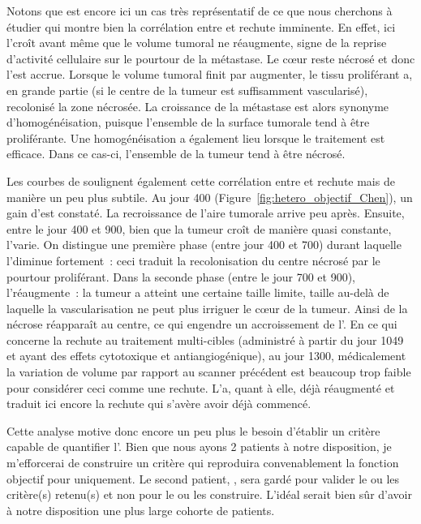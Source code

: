 \documentclass[main.tex]{subfiles}
\begin{document}
 
Notons que \Nber est encore ici un cas très représentatif de ce que nous  cherchons à étudier \ie qui montre bien la corrélation entre \hetero et rechute imminente. En effet, ici l'\hetero croît avant même que le volume tumoral ne réaugmente, signe de la reprise d'activité cellulaire sur le pourtour de la métastase. Le c\oe{}ur reste nécrosé et donc l'\hetero est accrue. Lorsque le volume tumoral  finit par augmenter, le tissu proliférant a, en grande partie (si le centre de la tumeur est suffisamment vascularisé), recolonisé la zone nécrosée. La croissance de la métastase est alors synonyme d'homogénéisation, puisque l'ensemble de la surface tumorale tend à être proliférante. Une homogénéisation a également lieu lorsque le traitement est efficace. Dans ce cas-ci, l'ensemble de la tumeur tend à être nécrosé. 


Les courbes de \Chen soulignent également cette corrélation entre \hetero et rechute mais de manière un peu plus subtile. Au jour 400 (\cf Figure~\ref{fig:hetero_objectif_Chen}), un gain d'\hetero est constaté. La recroissance de l'aire tumorale arrive peu après. Ensuite, entre le jour 400 et 900, bien que la tumeur croît de manière quasi constante, l'\hetero varie. On distingue une première phase (entre jour 400 et 700) durant laquelle l'\hetero diminue fortement~: ceci traduit la recolonisation du centre nécrosé par le pourtour proliférant. Dans la seconde phase (entre le jour 700 et 900), l'\hetero réaugmente~: la tumeur a atteint une certaine taille limite, taille au-delà de laquelle la vascularisation ne peut plus irriguer le c\oe{}ur de la tumeur. 
Ainsi de la nécrose réapparaît au centre, ce qui engendre un accroissement de l'\hetero. 
En ce qui concerne la rechute au traitement multi-cibles (administré à partir du jour 1049 et ayant des effets cytotoxique et antiangiogénique), au jour 1300, médicalement la variation de volume par rapport au scanner précédent est beaucoup trop faible pour considérer ceci comme une rechute. L'\hetero a, quant à elle, déjà réaugmenté et traduit ici encore la rechute qui s'avère avoir déjà commencé.  


Cette analyse motive donc encore un peu plus le besoin d'établir un critère capable de quantifier l'\hetero. Bien que nous ayons 2 patients à notre disposition, je m'efforcerai de construire un critère qui reproduira convenablement la fonction objectif pour \Nber uniquement. Le second patient, \Chen, sera gardé pour valider le ou les critère(s) retenu(s) et non pour le ou les construire. L'idéal serait bien sûr d'avoir à notre disposition une plus large cohorte de patients.
\end{document}
